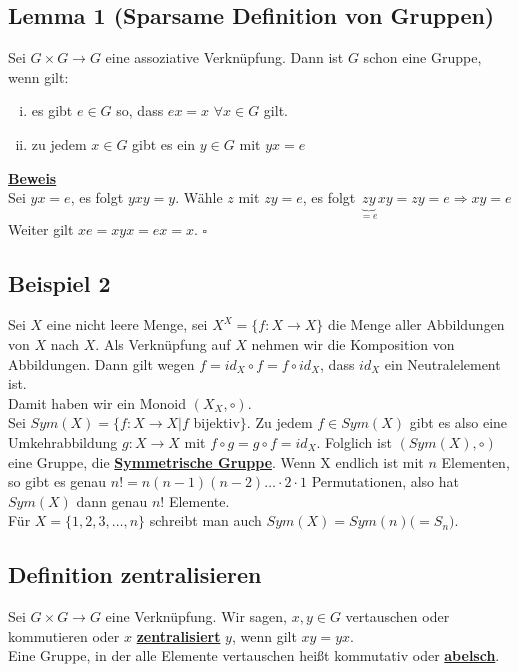 \documentclass[a4paper, pagesize=pdftex, pdftex, twoside, headsepline, index=totoc,toc=listof, fontsize=10pt, cleardoublepage=empty, headinclude, DIV=13, BCOR=13mm]{scrartcl}
\newcommand{\bet}[1]{\uline{\textbf{#1}}} %
\newcommand{\Index}[1]{\uline{\textbf{#1}}\index{#1}} %
\begin{document}
\subsection{Lemma 1 (Sparsame Definition von Gruppen)}
\label{sub:lemma_1}
Sei $G \times G \to G$ eine assoziative Verknüpfung. Dann ist $G$ schon eine Gruppe, wenn gilt:
\begin{enumerate}[(i)]
	\item es gibt $e \in G$ so, dass $ex=x$ $\forall x \in G$ gilt.
	\item zu jedem $x\in G$ gibt es ein $y \in G$ mit $ yx=e$
\end{enumerate}
\bet{Beweis}\\
Sei $yx=e$, es folgt $yxy=y$. Wähle $z$ mit $zy=e$, es folgt $\underbrace{zy}_{=e}xy=zy=e \Rightarrow xy=e$\\
Weiter gilt $xe=xyx=ex=x$.
\hfill $\square$

\subsection{Beispiel 2}
\label{sub: beispiel_2}
Sei $X$ eine nicht leere Menge, sei $X^X=\{f : X \to X\}$ die Menge aller Abbildungen von $X$ nach $X$. Als Verknüpfung auf $X$ nehmen wir die Komposition von Abbildungen. Dann gilt wegen $f=id_X \circ f= f \circ id_X$, dass $id_X$ ein Neutralelement ist.\\
Damit haben wir ein Monoid $(X_X, \circ )$.\\
Sei $Sym(X)=\{f:X\to X | f$ bijektiv$\}$. Zu jedem $f\in Sym(X)$ gibt es also eine Umkehrabbildung $g:X\to X$ mit $f \circ g=g\circ f=id_X$. Folglich ist $(Sym(X), \circ)$ eine Gruppe, die \bet{Symmetrische Gruppe}. Wenn X endlich ist mit $n$ Elementen, so gibt es genau $n!=n(n-1)(n-2)\dots \cdot 2\cdot 1$ Permutationen, also hat $Sym(X)$ dann genau $n!$ Elemente.\\
Für $X=\{1,2,3,\dots,n\}$ schreibt man auch $Sym(X)=Sym(n)\bigg( =S_n \bigg)$.

\subsection{Definition zentralisieren}
\label{sub:def_zentralisieren}
Sei $G \times G \to G$ eine Verknüpfung. Wir sagen, $x,y \in G$ vertauschen oder kommutieren oder $x$ \Index{zentralisiert} $y$, wenn gilt $xy=yx$.\\
Eine Gruppe, in der alle Elemente vertauschen heißt kommutativ oder \Index{abelsch}. 
\end{document}
